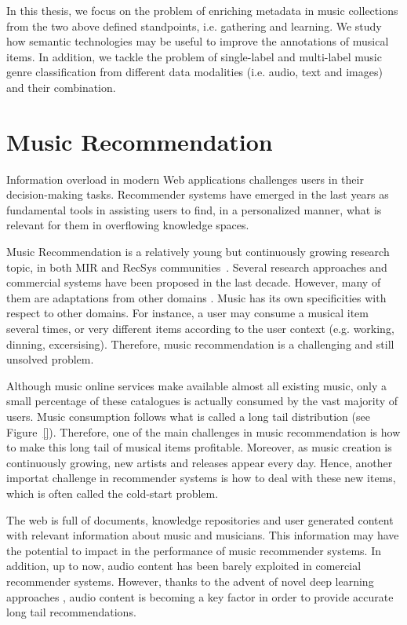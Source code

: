 In this thesis, we focus on the problem of enriching metadata in music collections from the two above defined standpoints, i.e. gathering and learning. We study how semantic technologies may be useful to improve the annotations of musical items. In addition, we tackle the problem of single-label and multi-label music genre classification from different data modalities (i.e. audio, text and images) and their combination.


\section{Music Recommendation}
\label{sec:intro:recommendation}

Information overload in modern Web applications challenges users in their decision-making tasks. Recommender systems have emerged in the last years as fundamental tools in assisting users to find, in a personalized manner, what is relevant for them in overflowing knowledge spaces. 

Music Recommendation is a relatively young but continuously growing research topic, in both MIR and RecSys communities~\cite{oscarBook}. Several research approaches and commercial systems have been proposed in the last decade. However, many of them are adaptations from other domains \cite{oscarBook}. 
Music has its own specificities with respect to other domains. For instance, a user may consume a musical item several times, or very different items according to the user context (e.g. working, dinning, excersising). Therefore, music recommendation is a challenging and still unsolved problem.

Although music online services make available almost all existing music, only a small percentage of these catalogues is actually consumed by the vast majority of users. Music consumption follows what is called a long tail distribution \cite{oscarBook} (see Figure~\ref{}). Therefore, one of the main challenges in music recommendation is how to make this long tail of musical items profitable. Moreover, as music creation is continuously growing, new artists and releases appear every day. Hence, another importat challenge in recommender systems is how to deal with these new items, which is often called the cold-start problem.

The web is full of documents, knowledge repositories and user generated content with relevant information about music and musicians. This information may have the potential to impact in the performance of music recommender systems. In addition, up to now, audio content has been barely exploited in comercial recommender systems. However, thanks to the advent of novel deep learning approaches \cite{Oord2013}, audio content is becoming a key factor in order to provide accurate long tail recommendations.

